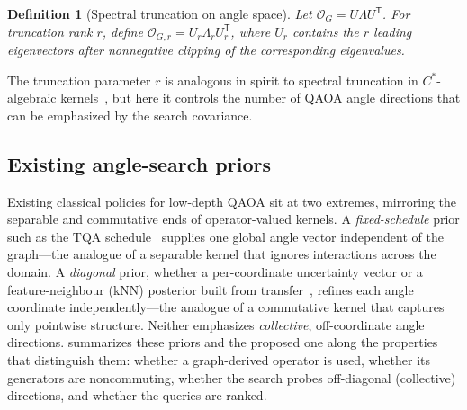 \documentclass[aps,prresearch,reprint,amsmath,amssymb,floatfix,nofootinbib,superscriptaddress,longbibliography]{revtex4-2}
\newtheorem{definition}{Definition}
\theoremstyle{remark}
\newcommand{\QAOA}{\textnormal{\textsc{QAOA}}}
\newcommand{\OSTQAOA}{\textnormal{\textsc{OST-QAOA}}}
\newcommand{\TQA}{\textnormal{\textsc{TQA}}}
\newcommand{\calO}{\mathcal{O}}
\begin{document}
\begin{definition}[Spectral truncation on angle space]
\label{def:trunc}
Let \(\calO_G=U\Lambda U^{\mathsf T}\).  For truncation rank \(r\), define
\(\calO_{G,r}=U_r\Lambda_rU_r^{\mathsf T}\), where \(U_r\) contains the \(r\)
leading eigenvectors after nonnegative clipping of the corresponding eigenvalues.
\end{definition}

The truncation parameter \(r\) is analogous in spirit to spectral truncation in
\(C^*\)-algebraic kernels~\cite{hashimoto2024spectral}, but here it controls the
number of QAOA angle directions that can be emphasized by the search covariance.

\subsection{Existing angle-search priors}
\label{sec:existing}

Existing classical policies for low-depth \QAOA{} sit at two extremes, mirroring
the separable and commutative ends of operator-valued kernels.  A
\emph{fixed-schedule} prior such as the \TQA{} schedule~\cite{sack2021} supplies
one global angle vector independent of the graph---the analogue of a separable
kernel that ignores interactions across the domain.  A \emph{diagonal} prior,
whether a per-coordinate uncertainty vector or a feature-neighbour (kNN)
posterior built from transfer~\cite{galda2021,shaydulin2023transfer}, refines
each angle coordinate independently---the analogue of a commutative kernel that
captures only pointwise structure.  Neither emphasizes \emph{collective},
off-coordinate angle directions.   summarizes these priors and
the proposed one along the properties that distinguish them: whether a
graph-derived operator is used, whether its generators are noncommuting, whether
the search probes off-diagonal (collective) directions, and whether the queries
are ranked.

\begin{table}[t]
\centering
\caption{Summary of the existing and the proposed angle-search priors.
The proposed \OSTQAOA{} prior is the only one that builds a graph-derived
operator from noncommuting generators and searches its off-diagonal collective
directions under a ranked query budget; the diagonal and fixed-schedule priors
are its commutative and separable special cases (\cref{prop:limit}).}
\label{tab:summary}

\end{table}
\end{document}
